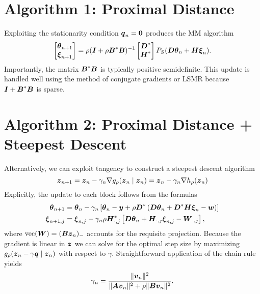 \documentclass{article}
\begin{document}
\section*{\center Algorithm 1: Proximal Distance}
Exploiting the stationarity condition \(\boldsymbol{q}_{n} = \boldsymbol{0}\) produces the MM algorithm
\begin{equation*}
    \begin{bmatrix}
        \boldsymbol{\theta}_{n+1} \\
        \boldsymbol{\xi}_{n+1}
    \end{bmatrix}
    =
    \rho (\boldsymbol{I} + \rho \boldsymbol{B}^{\ast} \boldsymbol{B})^{-1}
    \begin{bmatrix}
        \boldsymbol{D}^{\ast} \\
        \boldsymbol{H}^{\ast}
    \end{bmatrix}
    P_{S}(\boldsymbol{D} \boldsymbol{\theta}_{n} + \boldsymbol{H} \boldsymbol{\xi}_{n}).
\end{equation*}
Importantly, the matrix \(\boldsymbol{B}^{\ast} \boldsymbol{B}\) is typically positive semidefinite.
This update is handled well using the method of conjugate gradients or LSMR because \(\boldsymbol{I} + \boldsymbol{B}^{\ast} \boldsymbol{B}\) is sparse.

\section*{\center Algorithm 2: Proximal Distance + Steepest Descent}

Alternatively, we can exploit tangency to construct a steepest descent algorithm
\begin{equation*}
    \boldsymbol{z}_{n+1}
    =
    \boldsymbol{z}_{n} - \gamma_{n} \nabla g_{\rho}(\boldsymbol{z}_{n} \mid \boldsymbol{z}_{n})
    =
    \boldsymbol{z}_{n} - \gamma_{n} \nabla h_{\rho}(\boldsymbol{z}_{n})
\end{equation*}
Explicitly, the update to each block follows from the formulas
\begin{align*}
    \boldsymbol{\theta}_{n+1}
    &=
    \boldsymbol{\theta}_{n} - \gamma_{n}\left[
        \boldsymbol{\theta}_{n} - \boldsymbol{y}
        + \rho \boldsymbol{D}^{\ast} \left(\boldsymbol{D} \boldsymbol{\theta}_{n}
        + \boldsymbol{D}^{\ast} \boldsymbol{H} \boldsymbol{\xi}_{n} - \boldsymbol{w}
        \right)
    \right] \\
    \boldsymbol{\xi}_{n+1,j}
    &=
    \boldsymbol{\xi}_{n,j} - \gamma_{n} \rho \boldsymbol{H}_{\cdot,j}^{\ast}\left[
        \boldsymbol{D} \boldsymbol{\theta}_{n}
        + \boldsymbol{H}_{\cdot,j} \boldsymbol{\xi}_{n,j}
        - \boldsymbol{W}_{\cdot,j}
    \right],
\end{align*}
where \(\mathop{\rm vec}\nolimits(\boldsymbol{W}) = (\boldsymbol{B} \boldsymbol{z}_{n})_{-}\) accounts for the requisite projection.
Because the gradient is linear in \(\boldsymbol{z}\) we can solve for the optimal step size by maximizing \(g_{\rho}(\boldsymbol{z}_{n} - \gamma \boldsymbol{q} \mid \boldsymbol{z}_{n})\) with respect to \(\gamma\).
Straightforward application of the chain rule yields
\begin{equation*}
    \gamma_{n}
    =
    \frac{\|\boldsymbol{v}_{n}\|^{2}}{\|\boldsymbol{A} \boldsymbol{v}_{n}\|^{2} + \rho \|\boldsymbol{B} \boldsymbol{v}_{n}\|^{2}}.
\end{equation*}
\end{document}
